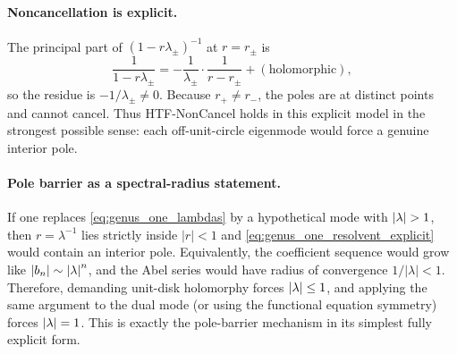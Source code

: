 \paragraph{Noncancellation is explicit.}
The principal part of $(1-r\lambda_\pm)^{-1}$ at $r=r_\pm$ is
\[
\frac{1}{1-r\lambda_\pm}
=-\frac{1}{\lambda_\pm}\cdot \frac{1}{r-r_\pm}+(\text{holomorphic}),
\]
so the residue is $-1/\lambda_\pm\neq 0$.
Because $r_+\neq r_-$, the poles are at distinct points and cannot cancel.
Thus HTF-NonCancel holds in this explicit model in the strongest possible sense: each off-unit-circle eigenmode would force a genuine interior pole.

\paragraph{Pole barrier as a spectral-radius statement.}
If one replaces \eqref{eq:genus_one_lambdas} by a hypothetical mode with $\left\lvert \lambda\right\rvert>1$, then $r=\lambda^{-1}$ lies strictly inside $|r|<1$ and \eqref{eq:genus_one_resolvent_explicit} would contain an interior pole.
Equivalently, the coefficient sequence would grow like $\left\lvert b_n\right\rvert\sim \left\lvert \lambda\right\rvert^n$, and the Abel series would have radius of convergence $1/|\lambda|<1$.
Therefore, demanding unit-disk holomorphy forces $\left\lvert \lambda\right\rvert\le 1$, and applying the same argument to the dual mode (or using the functional equation symmetry) forces $\left\lvert \lambda\right\rvert=1$.
This is exactly the pole-barrier mechanism in its simplest fully explicit form.


